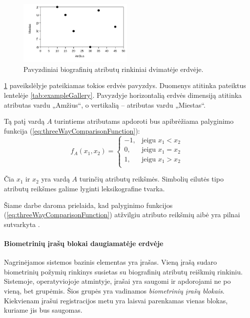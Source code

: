 \begin{figure}[H]
\begin{center}
\includegraphics[width=0.5\textwidth]{img/MultidimensionalGallery.png}
\caption{Pavyzdiniai biografinių atributų rinkiniai dvimatėje erdvėje.}
\label{img:multidimensionalGallery}
\end{center}
\end{figure}

\ref{img:multidimensionalGallery} paveikslėlyje pateikiamas tokios erdvės pavyzdys.
Duomenys atitinka pateiktus lentelėje \ref{tab:exampleGallery}.
Pavyzdyje horizontalią erdvės dimensiją atitinka atributas vardu „Amžius“, o vertikalią -- atributas vardu  „Miestas“.

Tą patį vardą $A$ turintiems atributams apdoroti bus apibrėžiama palyginimo funkcija (\ref{eq:threeWayComparisonFunction}):
\begin{equation}
	f_A(x_1, x_2)=
\begin{cases}
	-1,& \text{jeigu } x_1 < x_2\\
	0,& \text{jeigu } x_1 = x_2\\
	1,& \text{jeigu } x_1 > x_2\\
\end{cases}
\label{eq:threeWayComparisonFunction}
\end{equation}

Čia $x_1$ ir $x_2$ yra vardą $A$ turinčių atributų reikšmės.
Simbolių eilutės tipo atributų reikšmes galime lyginti leksikografine tvarka.

Šiame darbe daroma prielaida, kad palyginimo funkcijos (\ref{eq:threeWayComparisonFunction}) atžvilgiu atributo reikšmių aibė yra pilnai sutvarkyta \cite{hrbacek1999introduction}.




\paragraph{Biometrinių įrašų blokai daugiamatėje erdvėje}

Nagrinėjamos sistemos bazinis elementas yra įrašas.
Vieną įrašą sudaro biometrinių požymių rinkinys susietas su biografinių atributų reiškmių rinkiniu.
Sistemoje, operatyviojoje atmintyje, įrašai yra saugomi ir apdorojami ne po vieną, bet grupėmis.
Šios grupės yra vadinamos {\it biometrinių įrašų blokais}.
Kiekvienam įrašui registracijos metu yra laisvai parenkamas vienas blokas, kuriame jis bus saugomas.

